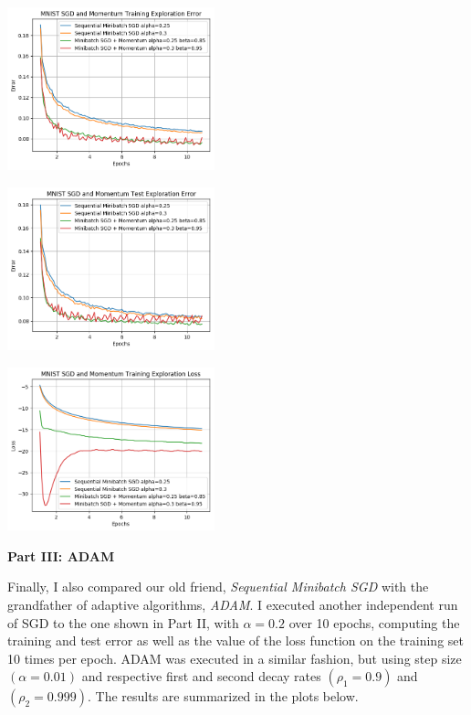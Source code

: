 \documentclass[10pt]{article}
\begin{document}
\begin{multicols}{2}
\begin{center}
    \includegraphics[width=0.45\textwidth]{SGDandMomentumTrainingExplorationError.png}
\end{center}
\begin{center}
    \includegraphics[width=0.45\textwidth]{SGDandMomentumTestExplorationError.png}
\end{center}
\begin{center}
    \includegraphics[width=0.45\textwidth]{SGDandMomentumTrainingExplorationLoss.png}
\end{center}
\columnbreak
\noindent
\textbf{Part III: ADAM} \par
Finally, I also compared our old friend, \textit{Sequential Minibatch SGD} with the grandfather of adaptive algorithms, \textit{ADAM}. I executed another independent run of SGD to the one shown in Part II, with $\alpha = 0.2$ over 10 epochs, computing the training and test error as well as the value of the loss function on the training set 10 times per epoch. ADAM was executed in a similar fashion, but using step size $(\alpha=0.01)$ and respective first and second decay rates $(\rho_1 = 0.9)$ and $(\rho_2 = 0.999)$. The results are summarized in the plots below.\par 

\end{multicols}
\end{document}
